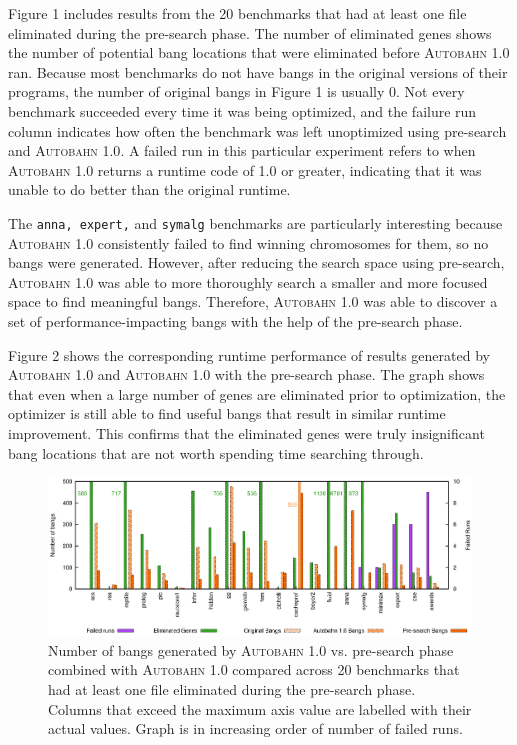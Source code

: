 \documentclass[format=sigplan, review=true]{acmart}
\newcommand{\useful}[0]{useful}
\newcommand{\Ao}[0]{\textsc{Autobahn 1.0}}
\newcommand{\preopt}[0]{pre-search}
\begin{document}
Figure 1 includes results from the 20 benchmarks that had at least one file eliminated during the \preopt{} phase. The number of eliminated genes shows the number of potential bang locations that were eliminated before \Ao{} ran. Because most benchmarks do not have bangs in the original versions of their programs, the number of original bangs in Figure 1 is usually 0. Not every benchmark succeeded every time it was being optimized, and the failure run column indicates how often the benchmark was left unoptimized using \preopt{} and \Ao{}. A failed run in this particular experiment refers to when \Ao{} returns a runtime code of 1.0 or greater, indicating that it was unable to do better than the original runtime.

The \texttt{anna, expert,} and \texttt{symalg} benchmarks are particularly interesting because \Ao{} consistently failed to find winning chromosomes for them, so no bangs were generated. However, after reducing the search space using \preopt{}, \Ao{} was able to more thoroughly search a smaller and more focused space to find meaningful bangs. Therefore, \Ao{} was able to discover a set of performance-impacting bangs with the help of the \preopt{} phase. 

Figure 2 shows the corresponding runtime performance of results generated by \Ao{} and \Ao{} with the \preopt{} phase. The graph shows that even when a large number of genes are eliminated prior to optimization, the optimizer is still able to find \useful{} bangs that result in similar runtime improvement. This confirms that the eliminated genes were truly insignificant bang locations that are not worth spending time searching through. 

\begin{figure}
\includegraphics[width=\textwidth]{pre-aut-bangs}
\caption{Number of bangs generated by \Ao{} vs. \preopt{} phase combined with \Ao{} compared across 20 benchmarks that had at least one file eliminated during the \preopt{} phase. Columns that exceed the maximum axis value are labelled with their actual values. Graph is in increasing order of number of failed runs.}
\end{figure}
\end{document}
